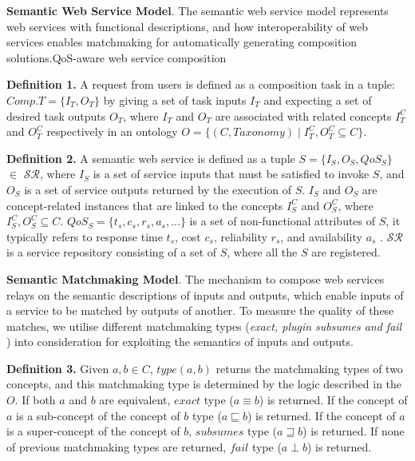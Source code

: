 \documentclass{llncs}
\begin{document}
\textbf{Semantic Web Service Model}. The semantic web service model represents web services with functional descriptions, and how interoperability of web services enables matchmaking for automatically generating composition solutions.QoS-aware web service composition \cite{da2016particle,da2015graphevol,yu2013adaptive,ma2015hybrid}

\textbf{Definition 1.} A request from users is defined as a composition task in a tuple: $Comp.T = \{I_{T}, O_{T}\}$ by giving a set of task inputs $I_{T}$ and expecting  a set of desired task outputs $O_{T}$, where $I_{T}$ and $O_{T}$ are associated with related concepts $I^{C}_{T}$ and $O^{C}_{T}$ respectively in an ontology $O = \{(C, Taxonomy) \mid I^{C}_{T}, O^{C}_{T}  \subseteq C \}$.

\textbf{Definition 2.} A semantic web service is defined as a tuple $S = \{ I_{S}, O_{S}, QoS_S \}$ $\in$ $\mathcal{SR}$, where $I_{S}$ is a set of service inputs that must be satisfied to invoke $S$, and $O_{S}$ is a set of service outputs returned by the execution of $S$. $I_{S}$ and $O_{S}$ are concept-related instances that are linked to the concepts $I^{C}_{S}$ and $O^{C}_{S}$, where $ I^{C}_{S}, O^{C}_{S}  \subseteq C$. $QoS_S = \{ t_s, c_s, r_s, a_s, ... \} $ is a set of non-functional attributes of $S$, it typically refers to response time $t_s$, cost $c_s$, reliability $r_s$, and availability $a_s$ \cite{zeng2003quality}. $\mathcal{SR}$ is a service repository consisting of a set of $S$, where all the $S$ are registered.
\vspace{0.3cm}

\textbf{Semantic Matchmaking Model}. The mechanism to compose web services relays on the semantic descriptions of inputs and outputs, which enable inputs of a service to be matched by outputs of another. To measure the quality of these matches, we utilise different matchmaking types (\textit{exact, plugin subsumes and fail} \cite{paolucci2002semantic} ) into consideration for exploiting the semantics of inputs and outputs.

\textbf{Definition 3.} Given $a, b \in C$, $type(a, b)$ returns the matchmaking types of two concepts, and this matchmaking type is determined by the logic described in the $O$. If both $a$ and $b$ are equivalent, $exact$ type ($a \equiv b$) is returned. If the concept of $a$ is a sub-concept of the concept of $b$ type ($a \sqsubseteq b$) is returned. If the concept of $a$ is a super-concept of the concept of $b$, $subsumes$ type ($a \sqsupseteq b$) is returned. If none of previous matchmaking types are returned, $fail$ type ($a \perp b$) is returned.
\end{document}
